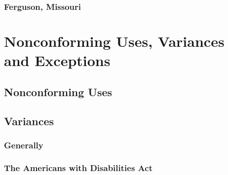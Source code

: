 \subsubsection{Ferguson, Missouri}




\begin{questions}

\end{questions}

\section{Nonconforming Uses, Variances and Exceptions}




\subsection{Nonconforming Uses}







\begin{questions}

\end{questions}


\subsection{Variances}


\subsubsection{Generally}






\begin{questions}

\end{questions}

% 


\subsubsection{The Americans with Disabilities Act}






